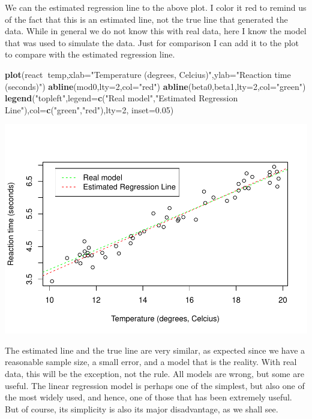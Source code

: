 \documentclass[
]{book}
\newenvironment{Shaded}{\begin{snugshade}}{\end{snugshade}}
\newcommand{\DataTypeTok}[1]{\textcolor[rgb]{0.13,0.29,0.53}{#1}}
\newcommand{\DecValTok}[1]{\textcolor[rgb]{0.00,0.00,0.81}{#1}}
\newcommand{\FloatTok}[1]{\textcolor[rgb]{0.00,0.00,0.81}{#1}}
\newcommand{\KeywordTok}[1]{\textcolor[rgb]{0.13,0.29,0.53}{\textbf{#1}}}
\newcommand{\NormalTok}[1]{#1}
\newcommand{\OperatorTok}[1]{\textcolor[rgb]{0.81,0.36,0.00}{\textbf{#1}}}
\newcommand{\StringTok}[1]{\textcolor[rgb]{0.31,0.60,0.02}{#1}}
\begin{document}
We can the estimated regression line to the above plot. I color it red to remind us of the fact that this is an estimated line, not the true line that generated the data. While in general we do not know this with real data, here I know the model that was used to simulate the data. Just for comparison I can add it to the plot to compare with the estimated regression line.

\begin{Shaded}
\begin{Highlighting}[]
\KeywordTok{plot}\NormalTok{(react}\OperatorTok{~}\NormalTok{temp,}\DataTypeTok{xlab=}\StringTok{"Temperature (degrees, Celcius)"}\NormalTok{,}\DataTypeTok{ylab=}\StringTok{"Reaction time (seconds)"}\NormalTok{)}
\KeywordTok{abline}\NormalTok{(mod0,}\DataTypeTok{lty=}\DecValTok{2}\NormalTok{,}\DataTypeTok{col=}\StringTok{"red"}\NormalTok{)}
\KeywordTok{abline}\NormalTok{(beta0,beta1,}\DataTypeTok{lty=}\DecValTok{2}\NormalTok{,}\DataTypeTok{col=}\StringTok{"green"}\NormalTok{)}
\KeywordTok{legend}\NormalTok{(}\StringTok{"topleft"}\NormalTok{,}\DataTypeTok{legend=}\KeywordTok{c}\NormalTok{(}\StringTok{"Real model"}\NormalTok{,}\StringTok{"Estimated Regression Line"}\NormalTok{),}\DataTypeTok{col=}\KeywordTok{c}\NormalTok{(}\StringTok{"green"}\NormalTok{,}\StringTok{"red"}\NormalTok{),}\DataTypeTok{lty=}\DecValTok{2}\NormalTok{, }\DataTypeTok{inset=}\FloatTok{0.05}\NormalTok{)}
\end{Highlighting}
\end{Shaded}

\includegraphics{ECOMODbook_files/figure-latex/reg9-1.pdf}

The estimated line and the true line are very similar, as expected since we have a reasonable sample size, a small error, and a model that is the reality. With real data, this will be the exception, not the rule. All models are wrong, but some are useful. The linear regression model is perhaps one of the simplest, but also one of the most widely used, and hence, one of those that has been extremely useful. But of course, its simplicity is also its major disadvantage, as we shall see.
\end{document}
